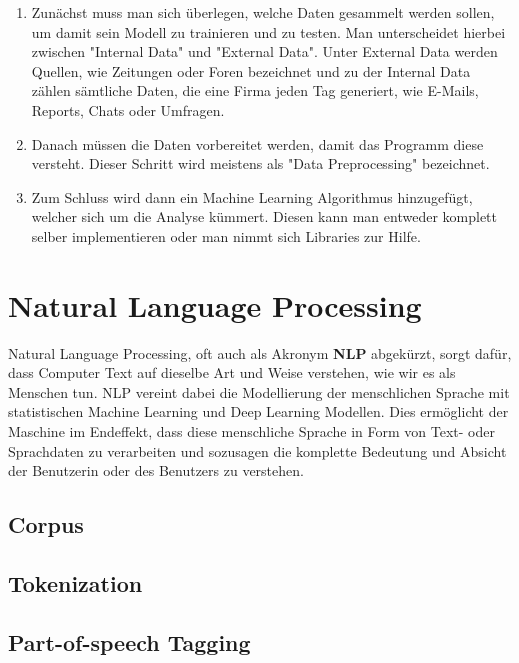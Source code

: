 \begin{enumerate}
    \item Zunächst muss man sich überlegen, welche Daten gesammelt werden sollen, um damit sein Modell zu trainieren und zu testen.
    Man unterscheidet hierbei zwischen "Internal Data" und "External Data".
    Unter External Data werden Quellen, wie Zeitungen oder Foren bezeichnet und zu der Internal Data zählen sämtliche Daten, die eine Firma jeden Tag generiert, wie E-Mails, Reports, Chats oder Umfragen.
    \item Danach müssen die Daten vorbereitet werden, damit das Programm diese versteht.
    Dieser Schritt wird meistens als "Data Preprocessing" bezeichnet.
    \item Zum Schluss wird dann ein Machine Learning Algorithmus hinzugefügt, welcher sich um die Analyse kümmert.
    Diesen kann man entweder komplett selber implementieren oder man nimmt sich Libraries zur Hilfe.\cite{machineLearningTextAnalysis}
\end{enumerate}

\section{Natural Language Processing}

Natural Language Processing, oft auch als Akronym \textbf{NLP} abgekürzt, sorgt dafür, dass Computer Text auf dieselbe Art und Weise verstehen, wie wir es als Menschen tun.
NLP vereint dabei die Modellierung der menschlichen Sprache mit statistischen Machine Learning und Deep Learning Modellen.
Dies ermöglicht der Maschine im Endeffekt, dass diese menschliche Sprache in Form von Text- oder Sprachdaten zu verarbeiten und sozusagen die komplette Bedeutung und Absicht der Benutzerin oder des Benutzers zu verstehen.\cite{naturalLanguageProcessingIBM}

\subsection{Corpus}


\subsection{Tokenization}


\subsection{Part-of-speech Tagging}


